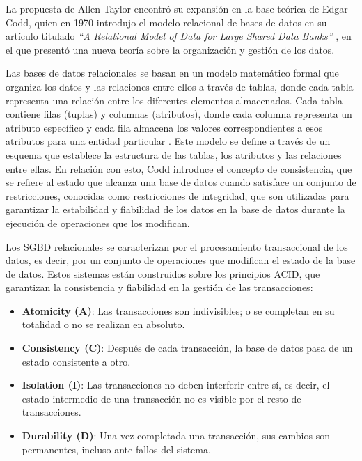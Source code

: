 La propuesta de Allen Taylor encontró su expansión en la base teórica de Edgar Codd, 
quien en 1970 introdujo el modelo relacional de bases de datos en su artículo 
titulado \textit{“A Relational Model of Data for Large Shared Data Banks”} \cite{Codd1970}, 
en el que presentó una nueva teoría sobre la organización y gestión de los datos.

Las bases de datos relacionales se basan en un modelo matemático formal que organiza 
los datos y las relaciones entre ellos a través de tablas, donde cada tabla representa 
una relación entre los diferentes elementos almacenados. Cada tabla contiene filas 
(tuplas) y columnas (atributos), donde cada columna representa un atributo específico y 
cada fila almacena los valores correspondientes a esos atributos para una entidad 
particular \cite{Chen2016}. Este modelo se define a través de un esquema que establece 
la estructura de las tablas, los atributos y las relaciones entre ellas. 
En relación con esto, Codd introduce el concepto de consistencia, que se refiere al 
estado que alcanza una base de datos cuando satisface un conjunto de restricciones, 
conocidas como restricciones de integridad, que son utilizadas para garantizar la 
estabilidad y fiabilidad de los datos en la base de datos durante la ejecución de 
operaciones que los modifican.

Los SGBD relacionales se caracterizan por el procesamiento transaccional de los datos, 
es decir, por un conjunto de operaciones que modifican el estado de la base de datos. 
Estos sistemas están construidos sobre los principios ACID, que garantizan la 
consistencia y fiabilidad en la gestión de las transacciones:

\begin{itemize}
    \item \textbf{Atomicity (A)}: Las transacciones son indivisibles; o se completan 
    en su totalidad o no se realizan en absoluto.
    \item \textbf{Consistency (C)}: Después de cada transacción, la base de datos 
    pasa de un estado consistente a otro.
    \item \textbf{Isolation (I)}: Las transacciones no deben interferir entre sí, 
    es decir, el estado intermedio de una transacción no es visible por el resto de 
    transacciones.
    \item \textbf{Durability (D)}: Una vez completada una transacción, sus cambios 
    son permanentes, incluso ante fallos del sistema.
\end{itemize}

